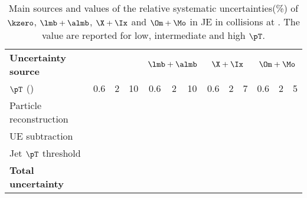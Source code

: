 \begin{table}[!ht]
	\begin{center}
		\caption{Main sources and values of the relative systematic uncertainties(\%) of $\kzero$,  $\lmb + \almb$, $\X + \Ix$ and $\Om + \Mo$ in JE in \pPb collisions at \fivenn.
			The value are reported for low, intermediate and high $\pT$.}
		\label{tab:pPbJEUncer}
		\begin{tabularx}{\textwidth}{@{} lCCCCCCCCCCCC @{}}
			\toprule
			\textbf{Uncertainty source} & 
			& 
			& 
			&  \\
			\cmidrule(lr){2-4}  \cmidrule(lr){5-7} \cmidrule(lr){8-10} \cmidrule(lr){11-13}
			$\pT$ (\GeVc) & 0.6 & 2 &10   & 0.6 & 2 & 10     & 0.6 & 2 & 7    & 0.6& 2 & 5 \\
			\midrule
			Particle reconstruction\\
			UE subtraction\\
			Jet $\pT$ threshold\\
			\midrule
			\textbf{Total uncertainty} \\
			\bottomrule
		\end{tabularx}
	\end{center}
\end{table}

